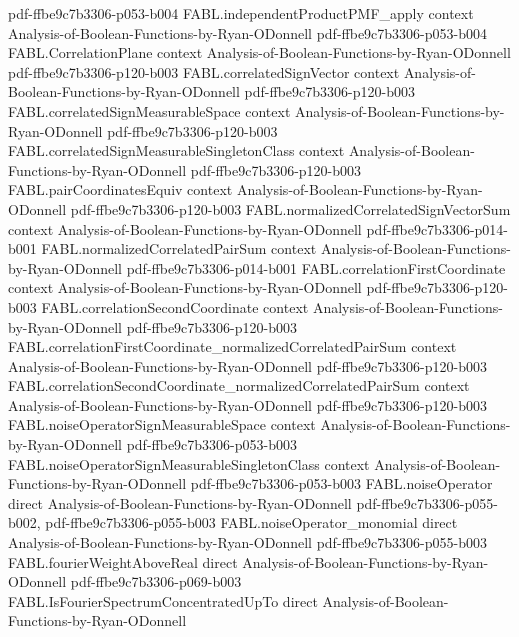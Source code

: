\begin{theorem}
  {pdf-ffbe9c7b3306-p053-b004}
\proofstep
  {FABL.independentProductPMF_apply}
  {context}
  {Analysis-of-Boolean-Functions-by-Ryan-ODonnell}
  {pdf-ffbe9c7b3306-p053-b004}
\proofstep
  {FABL.CorrelationPlane}
  {context}
  {Analysis-of-Boolean-Functions-by-Ryan-ODonnell}
  {pdf-ffbe9c7b3306-p120-b003}
\proofstep
  {FABL.correlatedSignVector}
  {context}
  {Analysis-of-Boolean-Functions-by-Ryan-ODonnell}
  {pdf-ffbe9c7b3306-p120-b003}
\proofstep
  {FABL.correlatedSignMeasurableSpace}
  {context}
  {Analysis-of-Boolean-Functions-by-Ryan-ODonnell}
  {pdf-ffbe9c7b3306-p120-b003}
\proofstep
  {FABL.correlatedSignMeasurableSingletonClass}
  {context}
  {Analysis-of-Boolean-Functions-by-Ryan-ODonnell}
  {pdf-ffbe9c7b3306-p120-b003}
\proofstep
  {FABL.pairCoordinatesEquiv}
  {context}
  {Analysis-of-Boolean-Functions-by-Ryan-ODonnell}
  {pdf-ffbe9c7b3306-p120-b003}
\proofstep
  {FABL.normalizedCorrelatedSignVectorSum}
  {context}
  {Analysis-of-Boolean-Functions-by-Ryan-ODonnell}
  {pdf-ffbe9c7b3306-p014-b001}
\proofstep
  {FABL.normalizedCorrelatedPairSum}
  {context}
  {Analysis-of-Boolean-Functions-by-Ryan-ODonnell}
  {pdf-ffbe9c7b3306-p014-b001}
\proofstep
  {FABL.correlationFirstCoordinate}
  {context}
  {Analysis-of-Boolean-Functions-by-Ryan-ODonnell}
  {pdf-ffbe9c7b3306-p120-b003}
\proofstep
  {FABL.correlationSecondCoordinate}
  {context}
  {Analysis-of-Boolean-Functions-by-Ryan-ODonnell}
  {pdf-ffbe9c7b3306-p120-b003}
\proofstep
  {FABL.correlationFirstCoordinate_normalizedCorrelatedPairSum}
  {context}
  {Analysis-of-Boolean-Functions-by-Ryan-ODonnell}
  {pdf-ffbe9c7b3306-p120-b003}
\proofstep
  {FABL.correlationSecondCoordinate_normalizedCorrelatedPairSum}
  {context}
  {Analysis-of-Boolean-Functions-by-Ryan-ODonnell}
  {pdf-ffbe9c7b3306-p120-b003}
\proofstep
  {FABL.noiseOperatorSignMeasurableSpace}
  {context}
  {Analysis-of-Boolean-Functions-by-Ryan-ODonnell}
  {pdf-ffbe9c7b3306-p053-b003}
\proofstep
  {FABL.noiseOperatorSignMeasurableSingletonClass}
  {context}
  {Analysis-of-Boolean-Functions-by-Ryan-ODonnell}
  {pdf-ffbe9c7b3306-p053-b003}
\proofstep
  {FABL.noiseOperator}
  {direct}
  {Analysis-of-Boolean-Functions-by-Ryan-ODonnell}
  {pdf-ffbe9c7b3306-p055-b002,
    pdf-ffbe9c7b3306-p055-b003}
\proofstep
  {FABL.noiseOperator_monomial}
  {direct}
  {Analysis-of-Boolean-Functions-by-Ryan-ODonnell}
  {pdf-ffbe9c7b3306-p055-b003}
\proofstep
  {FABL.fourierWeightAboveReal}
  {direct}
  {Analysis-of-Boolean-Functions-by-Ryan-ODonnell}
  {pdf-ffbe9c7b3306-p069-b003}
\proofstep
  {FABL.IsFourierSpectrumConcentratedUpTo}
  {direct}
  {Analysis-of-Boolean-Functions-by-Ryan-ODonnell}

\end{theorem}
